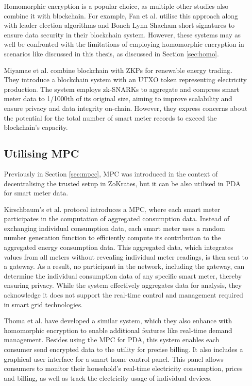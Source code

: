 Homomorphic encryption is a popular choice, as multiple other studies also combine it with  blockchain. For example, Fan et al. \cite{block_fan} utilise this approach along with leader election algorithms and Boneh-Lynn-Shacham short signatures to ensure data security in their blockchain system. However, these systems may as well be confronted with the limitations of employing homomorphic encryption in scenarios like discussed in this thesis, as discussed in Section \ref{sec:homo}. 

Miyamae et al. \cite{block3} combine blockchain with ZKPs for renewable energy trading. They introduce a blockchain system with an UTXO token representing electricity production. The system employs zk-SNARKs to aggregate and compress smart meter data to 1/1000th of its original size, aiming to improve scalability and ensure privacy and data integrity on-chain. However, they express concerns about the potential for the total number of smart meter records to exceed the blockchain’s capacity.

\subsection{Utilising MPC}

Previously in Section \ref{sec:mpcc}, MPC was introduced in the context of decentralising the trusted setup in ZoKrates, but it can be also utilised in PDA for smart meter data. 

Kirschbaum's et al. \cite{mpckir} protocol introduces a MPC, where each smart meter participates in the computation of aggregated consumption data. Instead of exchanging individual consumption data, each smart meter uses a random number generation function to efficiently compute its contribution to the aggregated energy consumption data. This aggregated data, which integrates values from all meters without revealing individual meter readings, is then sent to a gateway. As a result, no participant in the network, including the gateway, can determine the individual consumption data of any specific smart meter, thereby ensuring privacy. While the system effectively aggregates data for analysis, they acknowledge it does not support the real-time control and management required in smart grid technologies.

Thoma et al. \cite{mpcthom} have developed a similar system, which they also enhance with homomorphic encryption to enable additional features like real-time demand management. Besides using the MPC for PDA, this system enables each consumer send encrypted data to the utility for precise billing. It also includes a graphical user interface for a smart home control panel. This panel allows consumers to monitor their household's real-time electricity consumption, prices and billing, as well as track the electricity usage of individual devices.


